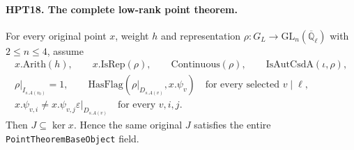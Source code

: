 \paragraph{HPT18. The complete low-rank point theorem.}
\label{claim:HPT18}
For every original point $x$, weight $h$ and representation
$\rho:G_L\to\mathrm{GL}_n(\overline{\mathbb Q}_\ell)$ with
$2\leq n\leq4$, assume
\[
 \begin{gathered}
 x.\mathrm{Arith}(h),\qquad x.\mathrm{IsRep}(\rho),\qquad
 \mathrm{Continuous}(\rho),\qquad \mathrm{IsAutCsdA}(\iota,\rho),\\
 \rho|_{I_{s.A(v_0)}}=1,\qquad
 \mathrm{HasFlag}(\rho|_{D_{s.A(v)}},x.\psi_v)
                  \quad\text{for every selected }v\mid\ell,\\
 x.\psi_{v,i}\ne x.\psi_{v,j}\varepsilon|_{D_{s.A(v)}}
                          \quad\text{for every }v,i,j .
 \end{gathered}                                                 \tag{HPT.17}
\]
Then $J\subseteq\ker x$.  Hence the same original $J$ satisfies
the entire \texttt{PointTheoremBaseObject} field.

